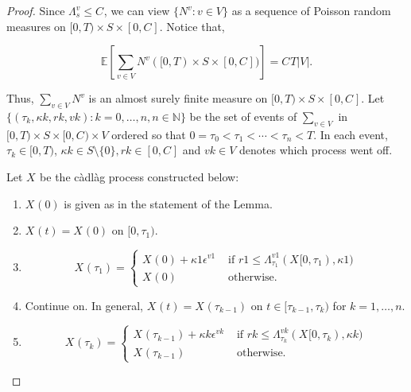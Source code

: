 \documentclass[12pt]{article}
\newcommand{\mb}{\mathbb}
\newcommand{\te}{\text}
\newcommand{\ep}{\epsilon}
\newcommand{\ind}{\hspace{24pt}}
\newcommand{\ex}[1]{\mb{E}\left[#1\right]}			%
\renewcommand{\v}{v}							%
\renewcommand{\S}{S}							%
\newcommand{\ev}{\ep}							%
\newcommand{\T}{T}								%
\renewcommand{\t}{t}							%
\renewcommand{\tt}{s}							%
\newcommand{\X}{X}								%
\newcommand{\vind}[1]{^{#1}}					%
\newcommand{\cind}[1]{_{#1}}					%
\newcommand{\tp}[1]{(#1)}						%
\newcommand{\tip}[1]{#1}						%
\newcommand{\ts}[1]{_{#1}}						%
\newcommand{\const}{C}							%
\newcommand{\poiss}{N}							%
\renewcommand{\r}{r}							%
\newcommand{\indx}[1]{_{#1}}					%
\newcommand{\rt}{\tau}							%
\renewcommand{\it}{k}							%
\renewcommand{\mark}{\kappa}					%
\newcommand{\ratee}{\Lambda}					%
\begin{document}
\begin{proof}
Since \(\ratee\ts{\tt}\vind{\v} \leq \const\indx{}\), we can view \(\{\poiss\vind{\v}:\v\in V\}\) as a sequence of Poisson random measures on \([0,\T)\times \S\times [0,\const\indx{}]\). Notice that,

\[\ex{\sum_{\v\in V}\poiss\vind{\v}([0,\T)\times\S\times[0,\const\indx{}])} = \const\indx{}\T|V|.\]

Thus, \(\sum_{\v\in V}\poiss\vind{\v}\) is an almost surely finite measure on \([0,\T)\times \S\times [0,\const\indx{}]\). Let \(\{(\rt\indx{\it},\mark{\it},\r{\it},\v{\it}):\it = 0,\dots,n, n\in \mb{N}\}\) be the set of events of \(\sum_{\v\in V}\) in \([0,\T)\times\S\times [0,\const\indx{})\times V\) ordered so that \(0=\rt\indx{0} < \rt\indx{1} < \cdots < \rt\indx{n} < \T\). In each event, \(\rt\indx{\it} \in [0,\T)\), \(\mark{\it}\in \S\setminus\{0\}, \r{\it} \in [0,\const\indx{}]\) and \(\v{\it} \in V\) denotes which process went off.

\ind Let \(\X\cind{}\tip{}\) be the c\`adl\`ag process constructed below:

\begin{enumerate}
\item \(\X\cind{}\tp{0}\) is given as in the statement of the Lemma.

\item \(\X\cind{}\tp{\t} = \X\cind{}\tp{0}\) on \([0,\rt\indx{1})\).

\item 

\[\X\cind{}\tp{\rt\indx{1}} = \begin{cases}
\X\cind{}\tp{0} + \mark{1}\ev\vind{\v{1}} &\te{ if } \r{1} \leq \ratee\ts{\rt\indx{1}}\vind{\v{1}}(\X\cind{}\tip{[0,\rt\indx{1})},\mark{1})\\
\X\cind{}\tp{0} &\te{ otherwise.}
\end{cases}
\] 

\item Continue on. In general, \(\X\cind{}\tp{\t} = \X\cind{}\tp{\rt\indx{\it-1}}\) on \(\t \in [\rt\indx{\it-1},\rt\indx{\it})\) for \(\it= 1,\dots,n\).

\item 

\[\X\cind{}\tp{\rt\indx{\it}} = \begin{cases}
\X\cind{}\tp{\rt\indx{\it-1}} + \mark{\it}\ev\vind{\v{\it}} &\te{ if } \r{\it} \leq \ratee\ts{\rt\indx{\it}}\vind{\v{\it}}(\X\cind{}\tip{[0,\rt\indx{\it})},\mark{\it})\\
\X\cind{}\tp{\rt\indx{\it-1}} &\te{ otherwise.}
\end{cases}\]


\end{enumerate}
\end{proof}
\end{document}
